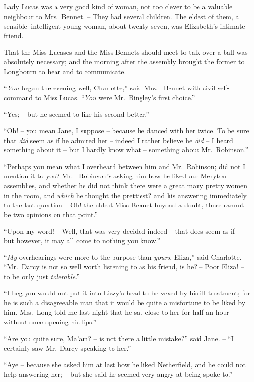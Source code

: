 Lady Lucas was a very good kind of woman, not too
clever to be a valuable neighbour to Mrs.\ Bennet. -- They
had several children. The eldest of them, a sensible,
intelligent young woman, about twenty-seven, was Elizabeth’s
intimate friend.

That the Miss Lucases and the Miss Bennets should
meet to talk over a ball was absolutely necessary; and
the morning after the assembly brought the former to
Longbourn to hear and to communicate.

“\textit{You} began the evening well, Charlotte,” said Mrs.\ %
Bennet with civil self-command to Miss Lucas. “\textit{You}
were Mr.\ Bingley’s first choice.”

“Yes; -- but he seemed to like his second better.”

“Oh! -- you mean Jane, I suppose -- because he danced
with her twice. To be sure that \textit{did} seem as if he admired
her -- indeed I rather believe he \textit{did} -- I heard something
about it -- but I hardly know what -- something about
Mr.\ Robinson.”

“Perhaps you mean what I overheard between him
and Mr.\ Robinson; did not I mention it to you? Mr.\ %
Robinson’s asking him how he liked our Meryton assemblies,
and whether he did not think there were a great
many pretty women in the room, and \textit{which} he thought
the prettiest? and his answering immediately to the last
question -- Oh! the eldest Miss Bennet beyond a doubt,
there cannot be two opinions on that point.”

“Upon my word! -- Well, that was very decided indeed -- that
does seem as if------but however, it may all come
to nothing you know.”

“\textit{My} overhearings were more to the purpose than \textit{yours},
Eliza,” said Charlotte. “Mr.\ Darcy is not so well worth
listening to as his friend, is he? -- Poor Eliza! -- to be only
just \textit{tolerable}.”

“I beg you would not put it into Lizzy’s head to
be vexed by his ill-treatment; for he is such a disagreeable
man that it would be quite a misfortune to be
liked by him. Mrs.\ Long told me last night that he
sat close to her for half an hour without once opening his
lips.”

“Are you quite sure, Ma’am? -- is not there a little
mistake?” said Jane. -- “I certainly saw Mr.\ Darcy
speaking to her.”

“Aye -- because she asked him at last how he liked
Netherfield, and he could not help answering her; -- but
she said he seemed very angry at being spoke to.”

